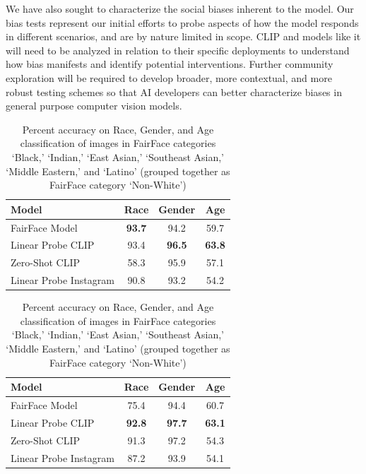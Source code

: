 \documentclass{article}
\begin{document}
We have also sought to characterize the social biases inherent to the model. Our bias tests represent our initial efforts to probe aspects of how the model responds in different scenarios, and are by nature limited in scope. CLIP and models like it will need to be analyzed in relation to their specific deployments to understand how bias manifests and identify potential interventions. Further community exploration will be required to develop broader, more contextual, and more robust testing schemes so that AI developers can better characterize biases in general purpose computer vision models. 


\begin{table}
\begin{minipage}{0.48\linewidth}
\vskip 0.17in
\begin{center}
\begin{tabular}{lccc}
\toprule
Model&Race&
\hspace{-0.3em}Gender\hspace{-0.3em}&
Age\\ \midrule
FairFace Model&
\textbf{93.7}&
94.2&
59.7\\
Linear Probe CLIP&
93.4&
\textbf{96.5}&
\textbf{63.8}\\
Zero-Shot CLIP&
58.3&
95.9&
57.1 \\
Linear Probe Instagram&
90.8&
93.2&
54.2 \\
\bottomrule
\end{tabular}
\caption{Percent accuracy on Race, Gender, and Age classification of images in FairFace category `White'\\ \\}
\label{fairface_table_white}
\end{center}
\vskip -0.2in
\end{minipage}\hfill\begin{minipage}{0.48\linewidth}
\vskip 0.17in
\begin{center}
\begin{tabular}{lccc}
\toprule
Model&Race&
\hspace{-0.3em}Gender\hspace{-0.3em}&
Age\\ \midrule
FairFace Model&
75.4&
94.4&
60.7\\
Linear Probe CLIP&
\textbf{92.8}&
\textbf{97.7}&
\textbf{63.1}\\
Zero-Shot CLIP&
91.3&
97.2&
54.3\\
Linear Probe Instagram&
87.2&
93.9&
54.1 \\
\bottomrule
\end{tabular}
\caption{Percent accuracy on Race, Gender, and Age classification of images in FairFace categories `Black,' `Indian,' `East Asian,' `Southeast
Asian,' `Middle Eastern,' and `Latino' (grouped together as FairFace category `Non-White')}
\label{fairface_table_nonwhite}
\end{center}
\vskip -0.2in
\end{minipage}
\end{table}
\end{document}
